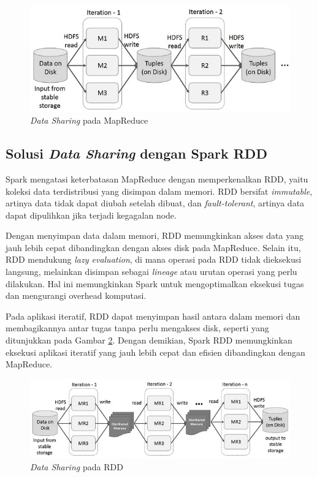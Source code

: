 \begin{figure}[h]
    \centering
    \includegraphics[width=1\textwidth]{figures/ch02/iterative_operations_on_mapreduce}
    \caption{\textit{Data Sharing} pada MapReduce \cite{ApacheSparkRDD}}
    \label{fig:iterative_operations_on_mapreduce}
\end{figure}

\subsection{Solusi \textit{Data Sharing} dengan Spark RDD}

Spark mengatasi keterbatasan MapReduce dengan memperkenalkan RDD, yaitu koleksi data terdistribusi yang disimpan dalam memori. RDD bersifat \textit{immutable}, artinya data tidak dapat diubah setelah dibuat, dan \textit{fault-tolerant}, artinya data dapat dipulihkan jika terjadi kegagalan node.

Dengan menyimpan data dalam memori, RDD memungkinkan akses data yang jauh lebih cepat dibandingkan dengan akses disk pada MapReduce. Selain itu, RDD mendukung \textit{lazy evaluation}, di mana operasi pada RDD tidak dieksekusi langsung, melainkan disimpan sebagai \textit{lineage} atau urutan operasi yang perlu dilakukan. Hal ini memungkinkan Spark untuk mengoptimalkan eksekusi tugas dan mengurangi overhead komputasi.

Pada aplikasi iteratif, RDD dapat menyimpan hasil antara dalam memori dan membagikannya antar tugas tanpa perlu mengakses disk, seperti yang ditunjukkan pada Gambar \ref{fig:iterative_operations_on_spark_rdd}. Dengan demikian, Spark RDD memungkinkan eksekusi aplikasi iteratif yang jauh lebih cepat dan efisien dibandingkan dengan MapReduce.

\begin{figure}[h]
    \centering
    \includegraphics[width=1\textwidth]{figures/ch02/iterative_operations_on_spark_rdd}
    \caption{\textit{Data Sharing} pada RDD \cite{ApacheSparkRDD}}
    \label{fig:iterative_operations_on_spark_rdd}
\end{figure}

